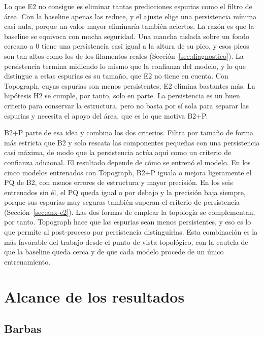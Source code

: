 Lo que E2 no consigue es eliminar tantas predicciones espurias como el
filtro de área. Con la baseline apenas las reduce, y el ajuste elige una
persistencia mínima casi nula, porque un valor mayor eliminaría también
aciertos. La razón es que la baseline se equivoca con mucha seguridad.
Una mancha aislada sobre un fondo cercano a $0$ tiene una persistencia
casi igual a la altura de su pico, y esos picos son tan altos como los
de los filamentos reales (Sección~\ref{sec:diagnostico}). La
persistencia termina midiendo lo mismo que la confianza del modelo, y lo
que distingue a estas espurias es su tamaño, que E2 no tiene en cuenta.
Con Topograph, cuyas espurias son menos persistentes, E2 elimina
bastantes más. La hipótesis H2 se cumple, por tanto, solo en parte. La
persistencia es un buen criterio para conservar la estructura, pero no
basta por sí sola para separar las espurias y necesita el apoyo del
área, que es lo que motiva B2+P.

B2+P parte de esa idea y combina los dos criterios. Filtra por tamaño de
forma más estricta que B2 y solo rescata las componentes pequeñas con
una persistencia casi máxima, de modo que la persistencia actúa aquí
como un criterio de confianza adicional. El resultado depende de cómo se
entrenó el modelo. En los cinco modelos entrenados con Topograph, B2+P
iguala o mejora ligeramente el PQ de B2, con menos errores de estructura
y mayor precisión. En los seis entrenados sin él, el PQ queda igual o
por debajo y la precisión baja siempre, porque sus espurias muy seguras
también superan el criterio de persistencia
(Sección~\ref{sec:anx-e2}). Las dos formas de emplear la topología se
complementan, por tanto. Topograph hace que las espurias sean menos
persistentes, y eso es lo que permite al post-proceso por persistencia
distinguirlas. Esta combinación es la más favorable del trabajo desde el
punto de vista topológico, con la cautela de que la baseline queda cerca
y de que cada modelo procede de un único entrenamiento.

\section{Alcance de los resultados}
\label{sec:res-alcance}

\subsection{Barbas}
\label{sec:res-barbas}

